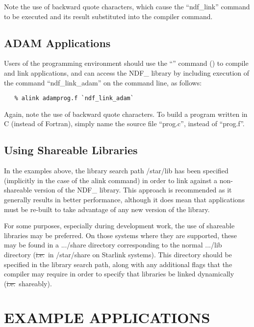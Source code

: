 Note the use of backward quote characters, which cause the
``ndf\_link'' command to be executed and its result substituted into
the compiler command.

\subsection{\label{ss:buildingadamapplications}ADAM Applications}
Users of the  programming environment
 should use
the ``'' command
() to compile and link applications, and can
access
the NDF\_ library by including execution of the command
``ndf\_link\_adam'' on the command line, as follows:

\small
\begin{verbatim}
   % alink adamprog.f `ndf_link_adam`
\end{verbatim}
\normalsize

Again, note the use of backward quote characters. To build a program
written in C (instead of Fortran), simply name the source file
``prog.c'', instead of ``prog.f''.

\subsection{Using Shareable Libraries}
In the examples above, the library search path /star/lib has been
specified (implicitly in the case of the alink command) in order to
link against a non-shareable version of the NDF\_ library. This
approach is recommended as it generally results in better performance,
although it does mean that applications must be re-built to take
advantage of any new version of the library.

For some purposes, especially during development work, the use of
shareable libraries may be preferred. On those systems where they
are supported, these may be found in a .../share directory
corresponding to the normal .../lib directory (\st{i.e.}\ in
/star/share on Starlink systems). This directory should be specified
in the library search path, along with any additional flags that the
compiler may require in order to specify that libraries be linked
dynamically (\st{i.e.}\ shareably).

\newpage
\appendix
\section{\label{ss:exampleapplications}EXAMPLE APPLICATIONS}

